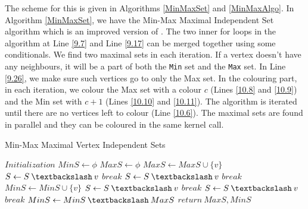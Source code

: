 \documentclass[MTech]{iitmdiss}
\begin{document}
The scheme for this is given in Algorithms \ref{MinMaxSet} and \ref{MinMaxAlgo}. In Algorithm \ref{MinMaxSet}, we have the Min-Max Maximal Independent Set algorithm which is an improved version of \citet{Luby:1985:SPA:22145.22146}. The two inner for loops in the algorithm at Line \ref{9.7} and Line \ref{9.17} can be merged together using some conditionals. We find two maximal sets in each iteration. If a vertex doesn't have any neighbours, it will be a part of both the \verb+Min+ set and the \verb+Max+ set. In Line \ref{9.26}, we make sure such vertices go to only the Max set. In the colouring part, in each iteration, we colour the Max set with a colour $c$ (Lines \ref{10.8} and \ref{10.9}) and the Min set with $c+1$ (Lines \ref{10.10} and \ref{10.11}). The algorithm is iterated until there are no vertices left to colour (Line \ref{10.6}). The maximal sets are found in parallel and they can be coloured in the same kernel call.  

\begin{algorithm}
\caption{Min-Max Maximal Vertex Independent Sets}\label{MinMaxSet}
\begin{algorithmic}[1]
\State $\textit{Initialization}$
\State $MinS \gets \phi$
\State $MaxS \gets \phi$
\State $MaxS \gets MaxS \cup \{v\}$
\label{9.7}
\State $S \gets S \: \textbackslash \: v$
\State $\textit{break}$
\Else {} 
\State $S \gets S \: \textbackslash \: v$
\State $\textit{break}$
\EndIf
\EndIf
\EndIf
\EndFor
\State $MinS \gets MinS \cup \{v\}$
\label{9.17}
\State $S \gets S \: \textbackslash \: v$
\State $\textit{break}$
\Else {} 
\State $S \gets S \: \textbackslash \: v$
\State $\textit{break}$
\EndIf
\EndIf
\EndIf
\EndFor
\EndFor
\State $MinS \gets MinS \: \textbackslash \: MaxS$ \label{9.26}
\State $\textit{return} \: MaxS, MinS$ 
\EndProcedure
\end{algorithmic}
\end{algorithm}
\end{document}

